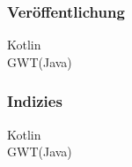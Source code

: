 \subsubsection{Veröffentlichung}
\begin{description}
	\item[Kotlin] 
	\item[GWT(Java)] 
\end{description}

\subsubsection{Indizies}
\begin{description}
	\item[Kotlin] 
	\item[GWT(Java)] 
\end{description}



